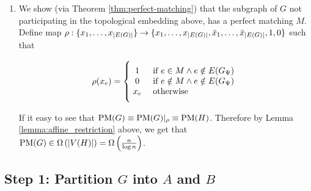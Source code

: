 \documentclass[11pt]{article}
\begin{document}
\begin{enumerate}
	
	\item We show (via Theorem \ref{thm:perfect-matching}) that the subgraph of $G$ not participating in the topological embedding above, has a perfect matching $M$. Define map $\rho: \{x_1, \dots, x_{|E(G)|}\} \rightarrow \{x_1, \dots, x_{|E(G)|}, \bar{x}_1, \dots, \bar{x}_{|E(G)|}, 1, 0 \}$ such that 
	
	\[
        \rho(x_e)=
        \Bigger[10]\{\begin{array}{@{}cl}
                1 & \text{ if $e \in M \land e \notin \Edges{G_{\EmbeddingFunc}}$} \\
                0 & \text{ if $e \notin M \land e \notin \Edges{G_{\EmbeddingFunc}}$}\\ 
                x_e & \text{ otherwise} 
        \end{array}
\]

	If it easy to see that $\text{PM}(G) \equiv \text{PM}(G)|_\rho \equiv \text{PM}(H)$. Therefore by Lemma \ref{lemma:affine_restriction} above, we get that $\text{PM}(G) \in \Omega\left(|V(H)|\right) = \Omega\left(\frac{n}{\log n}\right)$.

\end{enumerate}

\subsection{Step 1: Partition $G$ into $A$ and $B$}


\end{document}
